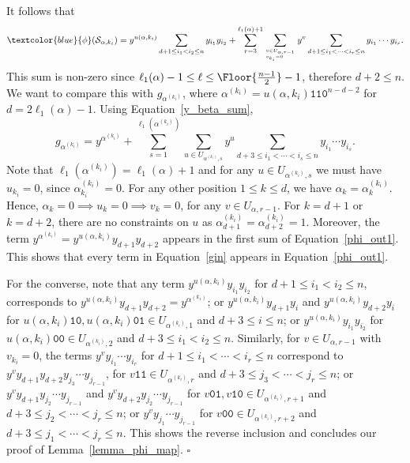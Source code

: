 \documentclass[10pt,a4paper]{article}
\newcommand{\blue}[1]{\textcolor{blue}{#1}}
\DeclarePairedDelimiter\Floor\lfloor\rfloor
\begin{document}
It follows that
\begin{equation}  \label{phi_out1}
    \blue{\phi}(\mathcal{S}_{\alpha, k_i}) =   y^{u(\alpha, k_i)} \sum_{d+1 \leq i_1 < i_2 \leq n}y_{i_1} y_{i_2} +  \sum_{r=3}^{\ell_1(\alpha)+1} \sum_{v \in U_{\alpha,r-1}\atop v_{k_i}=0\hfill} y^v \sum_{d+1 \leq i_1 < \cdots < i_{r} \leq n}y_{i_1} \cdots  y_{i_{r}}.  
\end{equation}
This sum is non-zero since $\ell_1(\alpha)-1\le\ell \le \Floor{\frac{n-1}{2}}-1$, therefore $d+2\le n$.
We want to compare this with $g_{\alpha^{(k_i)}}$, where $\alpha^{(k_i)}=u(\alpha, k_i)\texttt{110}^{n-d-2}$ for $d=2\ell_1(\alpha)-1$.
Using Equation~\eqref{y_beta_sum},
\begin{equation} \label{gin}
	g_{\alpha^{(k_i)}} = y^{{\alpha^{(k_i)}}}+  \sum_{s=1}^{\ell_1(\alpha^{(k_i)})} \sum_{u \in U_{\alpha^{(k_i)},s}} y^u
										\sum_{d+3 \leq i_1 < \cdots < i_s \leq n} y_{i_1} \cdots y_{i_{s}}. 
\end{equation}
Note that $\ell_1(\alpha^{(k_i)})=\ell_1(\alpha)+1$ and for any $u \in U_{\alpha^{(k_i)},s}$ we must have $u_{k_i}=0$, since $\alpha^{(k_i)}_{k_i}=0$. For any other position $1\le k\le d$, we have $\alpha_k=\alpha_k^{(k_i)}$. Hence, $\alpha_k=0 \implies u_k=0 \implies v_k=0$, for any  $v\in U_{\alpha,r-1}$. For $k=d+1$ or $k=d+2$, there are no constraints on $u$ as $\alpha_{d+1}^{(k_i)}=\alpha_{d+2}^{(k_i)}=1$. Moreover, the term $ y^{{\alpha^{(k_i)}}}=y^{u(\alpha, k_i)}y_{d+1}y_{d+2}$ appears in the first sum of Equation~\eqref{phi_out1}.
This shows that every term in Equation~\eqref{gin} appears in Equation~\eqref{phi_out1}.

For the converse, note that any term $y^{u(\alpha, k_i)} y_{i_1} y_{i_2}$  for $d+1 \leq i_1 < i_2 \leq  n$, corresponds to 
$y^{u(\alpha, k_i)} y_{d+1} y_{d+2}=y^{\alpha^{(k_1)}}$;
or $y^{u(\alpha, k_i)}y_{d+1}y_{i}$ and $y^{u(\alpha, k_i)}y_{d+2}y_{i}$ for $u(\alpha, k_i)\texttt{10}, u(\alpha, k_i)\texttt{01}\in U_{\alpha^{(k_i)},1}$ and
$d+3\le i\le n$;
or $y^{u(\alpha, k_i)}y_{i_1}y_{i_2}$ for $u(\alpha, k_i)\texttt{00}\in U_{\alpha^{(k_i)},2}$ and $d+3\le i_1<i_2\le n$.
Similarly, for $v\in U_{\alpha,r-1}$ with $v_{k_i}=0$, the terms $y^v y_{i_1} \cdots  y_{i_{r}} $ for $d+1 \leq i_1 < \cdots < i_{r} \leq n$ correspond to  
$y^vy_{d+1} y_{d+2} y_{j_{3}}\cdots  y_{j_{r-1}} $, for $v\texttt{11}\in U_{\alpha^{(k_i)},r}$ and $d+3 \leq j_3 < \cdots <j_{r} \leq n$; 
or 
$y^vy_{d+1} y_{j_{2}}\cdots  y_{j_{r-1}} $ and $y^vy_{d+2} y_{j_{2}}\cdots  y_{j_{r-1}} $ for $v\texttt{01},v\texttt{10} \in U_{\alpha^{(k_i)},r+1}$ and $d+3 \leq j_2< \cdots <j_{r} \leq n$;
or
$y^v y_{j_{1}}\cdots  y_{j_{r-1}} $ for $v\texttt{00} \in U_{\alpha^{(k_i)},r+2}$ and $d+3 \leq j_1< \cdots <j_{r} \leq n$.
This shows the reverse inclusion and concludes our proof of 
 Lemma~\ref{lemma_phi_map}. \hfill$\square$
\end{document}
